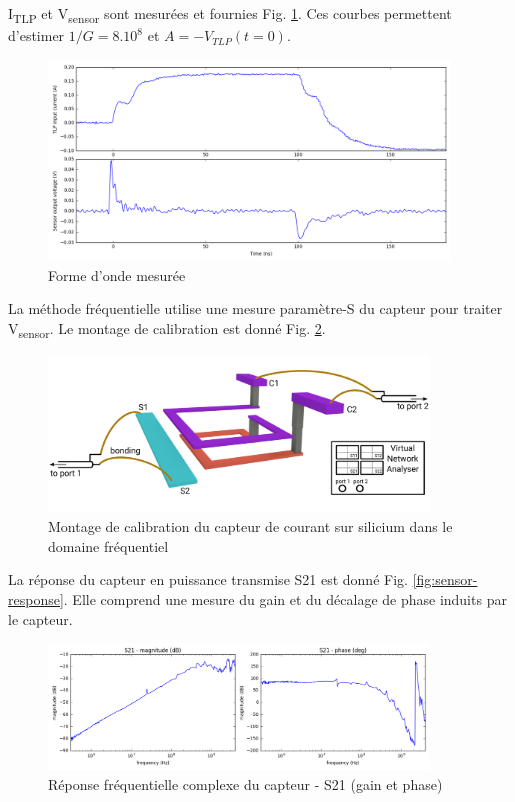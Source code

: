 I\textsubscript{TLP} et V\textsubscript{sensor} sont mesurées et fournies Fig. \ref{fig:measurement-nfs}.
Ces courbes permettent d'estimer $1/G = 8.10^8$ et $A = -V_{TLP}(t = 0)$.

\begin{figure}[!h]
  \centering
  \includegraphics[width=0.95\textwidth]{src/1/figures/measured_waveform.png}
  \caption{Forme d'onde mesurée}
  \label{fig:measurement-nfs}
\end{figure}

La méthode fréquentielle utilise une mesure paramètre-S du capteur pour traiter V\textsubscript{sensor}.
Le montage de calibration est donné Fig. \ref{fig:calibration-sensor-rf}.

\begin{figure}[!h]
  \centering
  \includegraphics[width=0.9\textwidth]{src/1/figures/sensor_measurement_setup_rf.pdf}
  \caption{Montage de calibration du capteur de courant sur silicium dans le domaine fréquentiel}
  \label{fig:calibration-sensor-rf}
\end{figure}

La réponse du capteur en puissance transmise S21 est donné Fig. \ref{fig:sensor-response}.
Elle comprend une mesure du gain et du décalage de phase induits par le capteur.

\begin{figure}[!h]
  \centering
  \includegraphics[width=0.9\textwidth]{src/1/figures/s21_freq_response.png}
  \caption{Réponse fréquentielle complexe du capteur - S21 (gain et phase)}
  \label{fig:s21-response-complex}
\end{figure}

